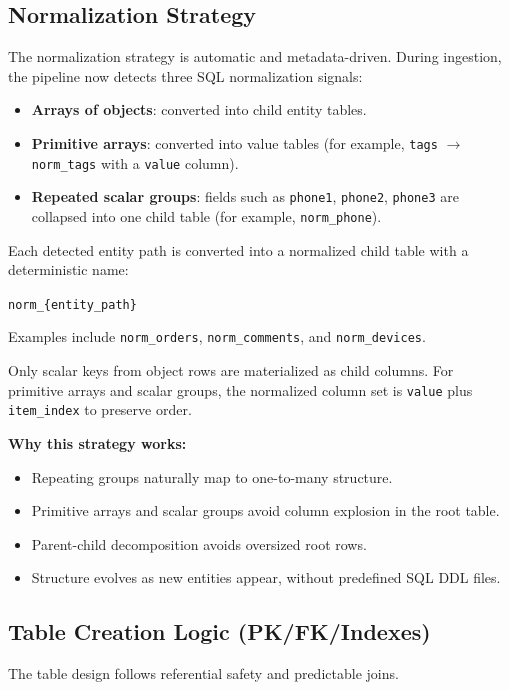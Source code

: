 \documentclass[12pt,a4paper]{article}
\begin{document}
\subsection{Normalization Strategy}
The normalization strategy is automatic and metadata-driven. During ingestion, the pipeline now detects three SQL normalization signals:
\begin{itemize}[leftmargin=*]
  \item \textbf{Arrays of objects}: converted into child entity tables.
  \item \textbf{Primitive arrays}: converted into value tables (for example, \texttt{tags} $\rightarrow$ \texttt{norm\_tags} with a \texttt{value} column).
  \item \textbf{Repeated scalar groups}: fields such as \texttt{phone1}, \texttt{phone2}, \texttt{phone3} are collapsed into one child table (for example, \texttt{norm\_phone}).
\end{itemize}

Each detected entity path is converted into a normalized child table with a deterministic name:
\begin{center}
\texttt{norm\_\{entity\_path\}}
\end{center}
Examples include \texttt{norm\_orders}, \texttt{norm\_comments}, and \texttt{norm\_devices}.

Only scalar keys from object rows are materialized as child columns. For primitive arrays and scalar groups, the normalized column set is \texttt{value} plus \texttt{item\_index} to preserve order.

\textbf{Why this strategy works:}
\begin{itemize}[leftmargin=*]
  \item Repeating groups naturally map to one-to-many structure.
  \item Primitive arrays and scalar groups avoid column explosion in the root table.
  \item Parent-child decomposition avoids oversized root rows.
  \item Structure evolves as new entities appear, without predefined SQL DDL files.
\end{itemize}

\subsection{Table Creation Logic (PK/FK/Indexes)}
The table design follows referential safety and predictable joins.
\end{document}
